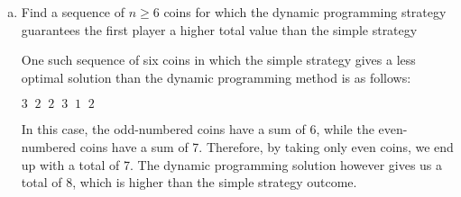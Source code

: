 \documentclass[12pt]{article}
\begin{document}
\begin{enumerate}[(a)]
\begin{addmargin}[2em]{2em}
\begin{lstlisting}
Function TurnSequence(MaxArray, Array)
	Let A be 0, and Z be sizeof(MaxArray) - 1
	Let Turn be True
	Let PlayerMoves be an array
	While A < Z
		Let FromStart be MaxArray[A + 1][Z]
		Let FromEnd be MaxArray[A][Z - 1]
		If Turn = True
			If FromStart <= FromEnd
				Push Array[A] to PlayerMoves
				A++
			Else
				Push Array[Z] to PlayerMoves
				Z--
		Else 
			Turn = !Turn
	Return PlayerMoves
\end{lstlisting}
\end{addmargin}
\item Find a sequence of $n \geq 6$ coins for which the dynamic programming strategy guarantees the first player a higher total value than the simple strategy
\begin{addmargin}[2em]{2em}
One such sequence of six coins in which the simple strategy gives a less optimal solution than the dynamic programming method is as follows:
\begin{center}
$3 \;\; 2 \;\; 2 \;\; 3 \;\; 1 \;\; 2$
\end{center}
In this case, the odd-numbered coins have a sum of 6, while the even-numbered coins have a sum of 7. Therefore, by taking only even coins, we end up with a total of 7. The dynamic programming solution however gives us a total of 8, which is higher than the simple strategy outcome.
\end{addmargin}
\end{enumerate}
\end{document}
